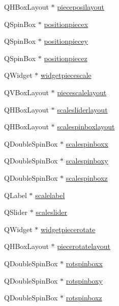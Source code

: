 \begin{DoxyCompactItemize}
\item 
Q\+H\+Box\+Layout $\ast$ \hyperlink{class_mondock_a676e96b53de7e8e4fd8f82c990b074df}{pieceposilayout}
\item 
Q\+Spin\+Box $\ast$ \hyperlink{class_mondock_ab93f251cb0119893cc7aadcd3ffb8eb1}{positionpiecex}
\item 
Q\+Spin\+Box $\ast$ \hyperlink{class_mondock_a82edda6549941e9c67700ed4562abba7}{positionpiecey}
\item 
Q\+Spin\+Box $\ast$ \hyperlink{class_mondock_ac4aa7f84daff43586674a324e0a69e24}{positionpiecez}
\item 
Q\+Widget $\ast$ \hyperlink{class_mondock_ac94f8cc2fda714079ee5a9ae363fe052}{widgetpiecescale}
\item 
Q\+V\+Box\+Layout $\ast$ \hyperlink{class_mondock_ae5f17873217894ff633f8dafc2907f9f}{piecescalelayout}
\item 
Q\+H\+Box\+Layout $\ast$ \hyperlink{class_mondock_a6a3248438048bf5db04e3e8b14a6fd3c}{scalesliderlayout}
\item 
Q\+H\+Box\+Layout $\ast$ \hyperlink{class_mondock_a3fdcf22d5b37219656eff1e9cf6973f8}{scalespinboxlayout}
\item 
Q\+Double\+Spin\+Box $\ast$ \hyperlink{class_mondock_a2f5f7e4641d0b15fc2c163667609fe04}{scalespinboxx}
\item 
Q\+Double\+Spin\+Box $\ast$ \hyperlink{class_mondock_a5659a916e3e6ca2e4f7b22610e903f8f}{scalespinboxy}
\item 
Q\+Double\+Spin\+Box $\ast$ \hyperlink{class_mondock_a218b1ecd2bf0e9d01622d1b46a55d460}{scalespinboxz}
\item 
Q\+Label $\ast$ \hyperlink{class_mondock_ad1002116acd630a0c97247a8459303c6}{scalelabel}
\item 
Q\+Slider $\ast$ \hyperlink{class_mondock_aeeaf93a255354e17ba515988712dd608}{scaleslider}
\item 
Q\+Widget $\ast$ \hyperlink{class_mondock_af63f72dedf5afeaf073592a02800c5bd}{widgetpiecerotate}
\item 
Q\+H\+Box\+Layout $\ast$ \hyperlink{class_mondock_a0a64de60226deeaa13c05d357ec20cef}{piecerotatelayout}
\item 
Q\+Double\+Spin\+Box $\ast$ \hyperlink{class_mondock_a4e20e77ae6e753019ae1e73b8d11290d}{rotspinboxx}
\item 
Q\+Double\+Spin\+Box $\ast$ \hyperlink{class_mondock_aff7adb8b724a2d8b097834487864f4ed}{rotspinboxy}
\item 
Q\+Double\+Spin\+Box $\ast$ \hyperlink{class_mondock_a0e78f599b45d731f0882942891bfbea2}{rotspinboxz}
\end{DoxyCompactItemize}


